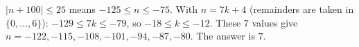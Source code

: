 $|n+100|\le25$ means $-125\le n\le-75$. With $n=7k+4$ (remainders are taken in $\{0,\dots,6\}$): $-129\le7k\le-79$, so $-18\le k\le-12$. These $7$ values give $n=-122,-115,-108,-101,-94,-87,-80$. The answer is $\boxed{7}$.
